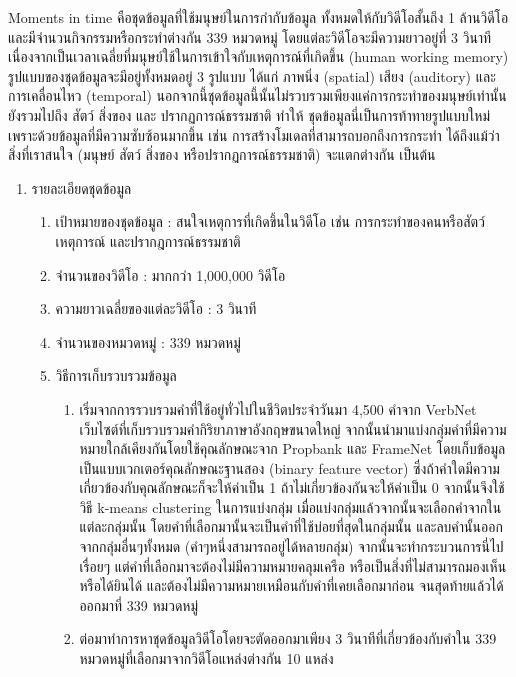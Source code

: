 Moments in time\textsuperscript{\cite{monfort2019moments}} คือชุดข้อมูลที่ใช้มนุษย์ในการกำกับข้อมูล ทั้งหมดให้กับวิดีโอสั้นถึง 1 ล้านวิดีโอ และมีจำนวนกิจกรรมหรือกระทำต่างกัน 339 หมวดหมู่ โดยแต่ละวิดีโอจะมีความยาวอยู่ที่ 3 วินาที เนื่องจากเป็นเวลาเฉลี่ยที่มนุษย์ใช้ในการเข้าใจกับเหตุการณ์ที่เกิดขึ้น (human working memory) รูปแบบของชุดข้อมูลจะมีอยู่ทั้งหมดอยู่ 3 รูปแบบ ได้แก่ ภาพนิ่ง (spatial) เสียง (auditory) และการเคลื่อนไหว (temporal) นอกจากนี้ชุดข้อมูลนี้นั้นไม่รวบรวมเพียงแค่การกระทำของมนุษย์เท่านั้น ยังรวมไปถึง สัตว์ สิ่งของ และ ปรากฏการณ์ธรรมชาติ ทำให้ ชุดข้อมูลนี่เป็นการท้าทายรูปแบบใหม่เพราะด้วยข้อมูลที่มีความซับซ้อนมากขึ้น เช่น การสร้างโมเดลที่สามารถบอกถึงการกระทำ ได้ถึงแม้ว่าสิ่งที่เราสนใจ (มนุษย์ สัตว์ สิ่งของ หรือปรากฏการณ์ธรรมชาติ) จะแตกต่างกัน เป็นต้น
\begin{enumerate}
	\item {รายละเอียดชุดข้อมูล}
	\begin{enumerate}
		\setlength\itemsep{-0.25em}
		\item เป้าหมายของชุดข้อมูล : สนใจเหตุการที่เกิดขึ้นในวิดีโอ เช่น การกระทำของคนหรือสัตว์ เหตุการณ์ และปรากฎการณ์ธรรมชาติ 
		\item จำนวนของวิดีโอ : มากกว่า 1,000,000 วิดีโอ
		\item ความยาวเฉลี่ยของแต่ละวิดีโอ : 3 วินาที
		\item จำนวนของหมวดหมู่ : 339 หมวดหมู่
		\item วิธีการเก็บรวบรวมข้อมูล
	\begin{enumerate}
		\item เริ่มจากการรวบรวมคำที่ใช้อยู่ทั่วไปในชีวิตประจำวันมา 4,500 คำจาก VerbNet\textsuperscript{\cite{Schuler:2005:VBC:1104493}} เว็บไซต์ที่เก็บรวบรวมคำกิริยาภาษาอังกฤษขนาดใหญ่ 
		จากนั้นนำมาแบ่งกลุ่มคำที่มีความหมายใกล้เคียงกันโดยใช้คุณลักษณะจาก Propbank\textsuperscript{\cite{Zaghouani:2010:RAP:1868720.1868756}} และ
		FrameNet\textsuperscript{\cite{Baker:1998:BFP:980451.980860}} โดยเก็บข้อมูลเป็นแบบเวกเตอร์คุณลักษณะฐานสอง (binary feature vector) 
		ซึ่งถ้าคำใดมีความเกี่ยวข้องกับคุณลักษณะก็จะให้ค่าเป็น 1 ถ้าไม่เกี่ยวข้องกันจะให้ค่าเป็น 0 จากนั้นจึงใช้วิธี k-means clustering ในการแบ่งกลุ่ม 
		เมื่อแบ่งกลุ่มแล้วจากนั้นจะเลือกคำจากในแต่ละกลุ่มนั้น โดยคำที่เลือกมานั้นจะเป็นคำที่ใช้บ่อยที่สุดในกลุ่มนั้น และลบคำนั้นออกจากกลุ่มอื่นๆทั้งหมด (คำๆหนึ่งสามารถอยู่ได้หลายกลุ่ม) 
		จากนั้นจะทำกระบวนการนี่ไปเรื่อยๆ แต่คำที่เลือกมาจะต้องไม่มีความหมายคลุมเครือ หรือเป็นสิ่งที่ไม่สามารถมองเห็นหรือได้ยินได้ และต้องไม่มีความหมายเหมือนกับคำที่เคยเลือกมาก่อน 
		จนสุดท้ายแล้วได้ออกมาที่ 339 หมวดหมู่
		\item ต่อมาทำการหาชุดข้อมูลวิดีโอโดยจะตัดออกมาเพียง 3 วินาทีที่เกี่ยวข้องกับคำใน 339 หมวดหมู่ที่เลือกมาจากวิดีโอแหล่งต่างกัน 10 แหล่ง 

\end{enumerate}
\end{enumerate}
\end{enumerate}
